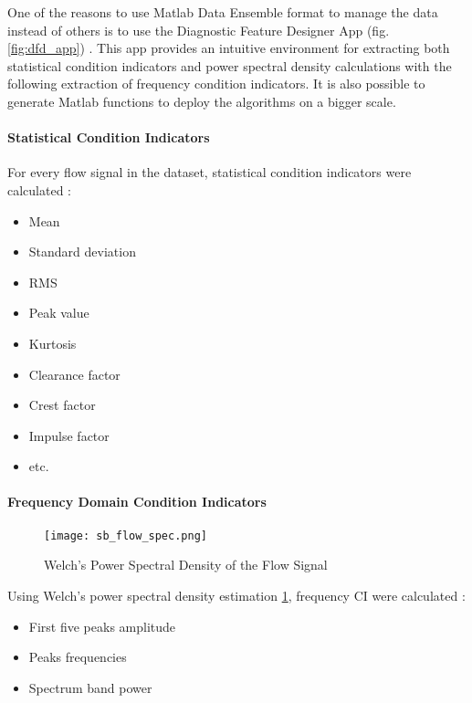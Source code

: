 One of the reasons to use Matlab Data Ensemble format to manage the data
instead of others is to use the Diagnostic Feature Designer App
(fig. \ref{fig:dfd_app}) \cite{dfd_app}.
This app provides an intuitive environment for extracting both statistical
condition indicators and power spectral density calculations with the
following extraction of frequency condition indicators. It is also possible
to generate Matlab functions to deploy the algorithms on a bigger scale.

\paragraph{Statistical Condition Indicators}

For every flow signal in the dataset, statistical condition indicators were
calculated \cite{matlab_intro}: 
\begin{itemize}
    \item Mean
    \item Standard deviation
    \item RMS
    \item Peak value
    \item Kurtosis
    \item Clearance factor
    \item Crest factor
    \item Impulse factor
    \item etc.
\end{itemize}


\paragraph{Frequency Domain Condition Indicators}

\begin{figure}[h!]
    \centering
    \texttt{[image: sb\_flow\_spec.png]}
    \caption{Welch's Power Spectral Density of the Flow Signal}
    \label{fig:flow_sp}
\end{figure}


Using Welch's power spectral density estimation \ref{fig:flow_sp}, frequency CI were
calculated \cite{matlab_full}: 

\begin{itemize}
\item First five peaks amplitude
\item Peaks frequencies
\item Spectrum band power
\end{itemize}


